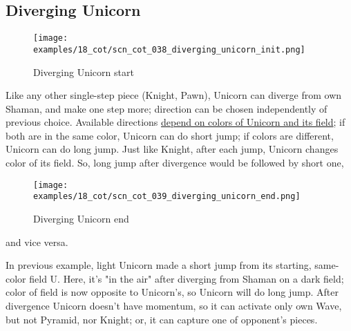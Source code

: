 \clearpage %

\subsection*{Diverging Unicorn}
\label{sec:Conquest of Tlalocan/Divergence/Diverging Unicorn}

\vspace*{-1.4\baselineskip}
\noindent
\begin{figure}[!h]
\texttt{[image: examples/18\_cot/scn\_cot\_038\_diverging\_unicorn\_init.png]}
\vspace*{-1.3\baselineskip}
\caption{Diverging Unicorn start}
\label{fig:scn_cot_038_diverging_unicorn_init}
\end{figure}

\vspace*{-0.5\baselineskip}
Like any other single-step piece (Knight, Pawn), Unicorn can diverge from own Shaman,
and make one step more; direction can be chosen independently of previous choice.
Available directions
\hyperref[fig:scn_aoa_01_unicorn_same_color]{depend on colors of Unicorn and its field};
if both are in the same color, Unicorn can do short jump; if colors are different, Unicorn
can do long jump. Just like Knight, after each jump, Unicorn changes color of its field.
So, long jump after divergence would be followed by short one,

\clearpage %

\vspace*{-2.1\baselineskip}
\noindent
\begin{figure}[!h]
\texttt{[image: examples/18\_cot/scn\_cot\_039\_diverging\_unicorn\_end.png]}
\vspace*{-1.3\baselineskip}
\caption{Diverging Unicorn end}
\label{fig:scn_cot_039_diverging_unicorn_end}
\end{figure}

\vspace*{-0.4\baselineskip}
\noindent
and vice versa.

In previous example, light Unicorn made a short jump from its starting, same-color
field U. Here, it's "in the air" after diverging from Shaman on a dark field; color
of field is now opposite to Unicorn's, so Unicorn will do long jump.
After divergence Unicorn doesn't have momentum, so it can activate only own Wave,
but not Pyramid, nor Knight; or, it can capture one of opponent's pieces.

